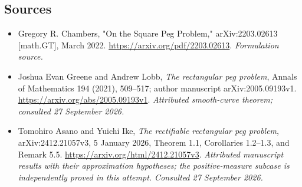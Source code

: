 \documentclass[11pt]{article}
\begin{document}
\subsection{Sources}
\begin{itemize}
\item[S1]Gregory R. Chambers, "On the Square Peg Problem," arXiv:2203.02613 [math.GT], March 2022.
\url{https://arxiv.org/pdf/2203.02613}.
\textit{Formulation source.}
\item[E1]Joshua Evan Greene and Andrew Lobb,
\emph{The rectangular peg problem}, Annals of Mathematics 194 (2021),
509--517; author manuscript arXiv:2005.09193v1.
\url{https://arxiv.org/abs/2005.09193v1}.
\textit{Attributed smooth-curve theorem; consulted 27 September 2026.}
\item[E2]Tomohiro Asano and Yuichi Ike,
\emph{The rectifiable rectangular peg problem}, arXiv:2412.21057v3,
5 January 2026, Theorem 1.1, Corollaries 1.2--1.3, and Remark 5.5.
\url{https://arxiv.org/html/2412.21057v3}.
\textit{Attributed manuscript results with their approximation hypotheses;
the positive-measure subcase is independently proved in this attempt.
Consulted 27 September 2026.}
\end{itemize}
\end{document}
